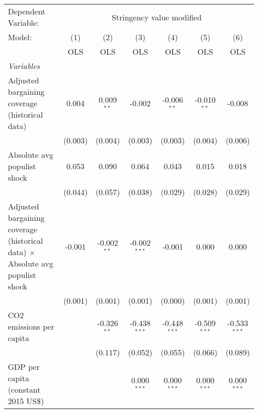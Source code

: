 
\begingroup
\centering
\begin{tabular}{lcccccc}
   \toprule
   Dependent Variable: & \multicolumn{6}{c}{Stringency value modified}\\
   Model:                                                                               & (1)     & (2)           & (3)            & (4)            & (5)            & (6)\\  
                                                                                        &  OLS    & OLS           & OLS            & OLS            & OLS            & OLS\\  
   \midrule
   \emph{Variables}\\
   Adjusted bargaining coverage (historical data)                                       & 0.004   & 0.009$^{**}$  & -0.002         & -0.006$^{**}$  & -0.010$^{**}$  & -0.008\\   
                                                                                        & (0.003) & (0.004)       & (0.003)        & (0.003)        & (0.004)        & (0.006)\\   
   Absolute avg populist shock                                                          & 0.053   & 0.090         & 0.064          & 0.043          & 0.015          & 0.018\\   
                                                                                        & (0.044) & (0.057)       & (0.038)        & (0.029)        & (0.028)        & (0.029)\\   
   Adjusted bargaining coverage (historical data) $\times$ Absolute avg populist shock  & -0.001  & -0.002$^{**}$ & -0.002$^{***}$ & -0.001         & 0.000          & 0.000\\   
                                                                                        & (0.001) & (0.001)       & (0.001)        & (0.000)        & (0.001)        & (0.001)\\   
   CO2 emissions per capita                                                             &         & -0.326$^{**}$ & -0.438$^{***}$ & -0.448$^{***}$ & -0.509$^{***}$ & -0.533$^{***}$\\   
                                                                                        &         & (0.117)       & (0.052)        & (0.055)        & (0.066)        & (0.089)\\   
   GDP per capita (constant 2015 US\$)                                                  &         &               & 0.000$^{***}$  & 0.000$^{***}$  & 0.000$^{***}$  & 0.000$^{***}$\\   

\end{tabular}
